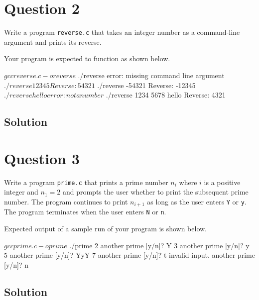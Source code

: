 \documentclass[12pt,letterpaper,twoside]{article}
\begin{document}
\section*{Question 2}

Write a program \texttt{reverse.c} that takes an integer number as a command-line argument and prints its reverse.

Your program is expected to function as shown below.

\begin{terminal}
$ gcc reverse.c -o reverse
$ ./reverse
error: missing command line argument
$ ./reverse 12345
Reverse: 54321
$ ./reverse -54321
Reverse: -12345
$ ./reverse hello
error: not a number
$ ./reverse 1234 5678 hello
Reverse: 4321
\end{terminal}

\subsection*{Solution}

\lstset{language=c,tabsize=4}


\newpage

\section*{Question 3}

Write a program \texttt{prime.c} that prints a prime number $n_i$ where $i$ is a positive integer and $n_1 = 2$ and prompts the user whether to print the subsequent prime number.
The program continues to print $n_{i+1}$ as long as the user enters \texttt{Y} or \texttt{y}.
The program terminates when the user enters \texttt{N} or \texttt{n}.

Expected output of a sample run of your program is shown below.

\begin{terminal}
$ gcc prime.c -o prime
$ ./prime
2
another prime [y/n]? Y
3
another prime [y/n]? y
5
another prime [y/n]? YyY
7
another prime [y/n]? t
invalid input.
another prime [y/n]? n
\end{terminal}

\subsection*{Solution}

\lstset{language=c,tabsize=4}


\newpage

\end{document}
